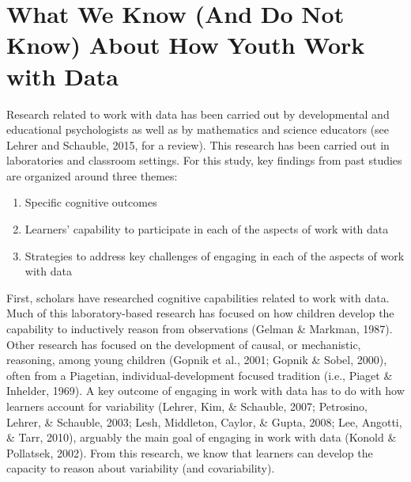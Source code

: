 \documentclass[]{book}
\providecommand{\tightlist}{%
  \setlength{\itemsep}{0pt}\setlength{\parskip}{0pt}}
\theoremstyle{definition}
\theoremstyle{definition}
\theoremstyle{definition}
\theoremstyle{remark}
\begin{document}
\section{What We Know (And Do Not Know) About How Youth Work with
Data}\label{what-we-know-and-do-not-know-about-how-youth-work-with-data}

Research related to work with data has been carried out by developmental
and educational psychologists as well as by mathematics and science
educators (see Lehrer and Schauble, 2015, for a review). This research
has been carried out in laboratories and classroom settings. For this
study, key findings from past studies are organized around three themes:

\begin{enumerate}
\def\labelenumi{\arabic{enumi}.}
\tightlist
\item
  Specific cognitive outcomes
\item
  Learners' capability to participate in each of the aspects of work
  with data
\item
  Strategies to address key challenges of engaging in each of the
  aspects of work with data
\end{enumerate}

First, scholars have researched cognitive capabilities related to work
with data. Much of this laboratory-based research has focused on how
children develop the capability to inductively reason from observations
(Gelman \& Markman, 1987). Other research has focused on the development
of causal, or mechanistic, reasoning, among young children (Gopnik et
al., 2001; Gopnik \& Sobel, 2000), often from a Piagetian,
individual-development focused tradition (i.e., Piaget \& Inhelder,
1969). A key outcome of engaging in work with data has to do with how
learners account for variability (Lehrer, Kim, \& Schauble, 2007;
Petrosino, Lehrer, \& Schauble, 2003; Lesh, Middleton, Caylor, \& Gupta,
2008; Lee, Angotti, \& Tarr, 2010), arguably the main goal of engaging
in work with data (Konold \& Pollatsek, 2002). From this research, we
know that learners can develop the capacity to reason about variability
(and covariability).
\end{document}
